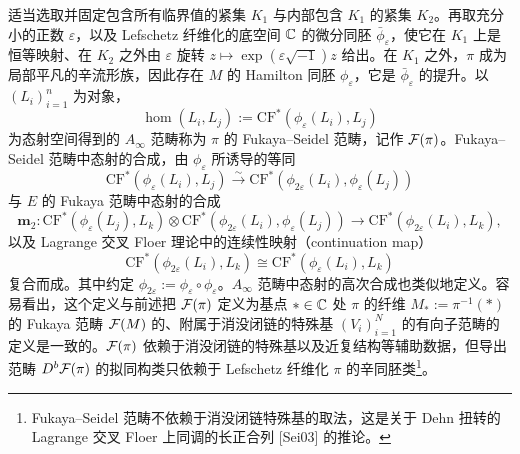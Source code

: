 适当选取并固定包含所有临界值的紧集 $K_1$ 与内部包含 $K_1$ 的紧集 $K_2$。再取充分小的正数 $\varepsilon$，以及 Lefschetz 纤维化的底空间 $\mathbb{C}$ 的微分同胚 $\bar\phi_\varepsilon$，使它在 $K_1$ 上是恒等映射、在 $K_2$ 之外由 $\varepsilon$ 旋转 $z\mapsto\exp(\varepsilon\sqrt{-1})z$ 给出。在 $K_1$ 之外，$\pi$ 成为局部平凡的辛流形族，因此存在 $M$ 的 Hamilton 同胚 $\phi_\varepsilon$，它是 $\bar\phi_\varepsilon$ 的提升。以 $(L_i)_{i=1}^n$ 为对象，
\begin{equation}
  \hom(L_i,L_j) := \mathrm{CF}^{*}(\phi_\varepsilon(L_i),L_j)
  \tag{13.3}
\end{equation}
为态射空间得到的 $A_\infty$ 范畴称为 $\pi$ 的 Fukaya–Seidel 范畴，记作 $\mathcal{F}(\pi)$。Fukaya–Seidel 范畴中态射的合成，由 $\phi_\varepsilon$ 所诱导的等同
\begin{equation}
  \mathrm{CF}^{*}(\phi_\varepsilon(L_i),L_j)\xrightarrow{\sim}\mathrm{CF}^{*}(\phi_{2\varepsilon}(L_i),\phi_\varepsilon(L_j))
  \tag{13.4}
\end{equation}
与 $E$ 的 Fukaya 范畴中态射的合成
\begin{equation}
  \mathbf{m}_2\colon \mathrm{CF}^{*}(\phi_\varepsilon(L_j),L_k)\otimes\mathrm{CF}^{*}(\phi_{2\varepsilon}(L_i),\phi_\varepsilon(L_j))
  \to\mathrm{CF}^{*}(\phi_{2\varepsilon}(L_i),L_k),
  \tag{13.5}
\end{equation}
以及 Lagrange 交叉 Floer 理论中的连续性映射（continuation map）
\begin{equation}
  \mathrm{CF}^{*}(\phi_{2\varepsilon}(L_i),L_k)\cong\mathrm{CF}^{*}(\phi_\varepsilon(L_i),L_k)
  \tag{13.6}
\end{equation}
复合而成。其中约定 $\phi_{2\varepsilon}:=\phi_\varepsilon\circ\phi_\varepsilon$。$A_\infty$ 范畴中态射的高次合成也类似地定义。容易看出，这个定义与前述把 $\mathcal{F}(\pi)$ 定义为基点 $*\in\mathbb{C}$ 处 $\pi$ 的纤维 $M_*:=\pi^{-1}(*)$ 的 Fukaya 范畴 $\mathcal{F}(M)$ 的、附属于消没闭链的特殊基 $(V_i)_{i=1}^N$ 的有向子范畴的定义是一致的。$\mathcal{F}(\pi)$ 依赖于消没闭链的特殊基以及近复结构等辅助数据，但导出范畴 $D^b\mathcal{F}(\pi)$ 的拟同构类只依赖于 Lefschetz 纤维化 $\pi$ 的辛同胚类\footnote{Fukaya–Seidel 范畴不依赖于消没闭链特殊基的取法，这是关于 Dehn 扭转的 Lagrange 交叉 Floer 上同调的长正合列 [Sei03] 的推论。}。


